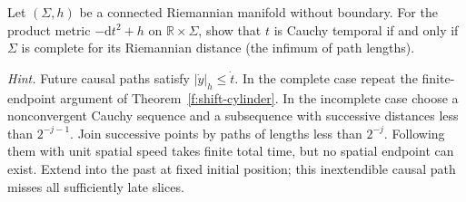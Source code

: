 \begin{exercise}
Let $(\Sigma,h)$ be a connected Riemannian manifold without boundary. For the product metric $-\mathrm dt^2+h$ on $\mathbb R\times\Sigma$, show that $t$ is Cauchy temporal if and only if $\Sigma$ is complete for its Riemannian distance (the infimum of path lengths).

\emph{Hint.} Future causal paths satisfy $|\dot y|_h\leq\dot t$. In the complete case repeat the finite-endpoint argument of Theorem~\ref{f:shift-cylinder}. In the incomplete case choose a nonconvergent Cauchy sequence and a subsequence with successive distances less than $2^{-j-1}$. Join successive points by paths of lengths less than $2^{-j}$. Following them with unit spatial speed takes finite total time, but no spatial endpoint can exist. Extend into the past at fixed initial position; this inextendible causal path misses all sufficiently late slices.
\end{exercise}
